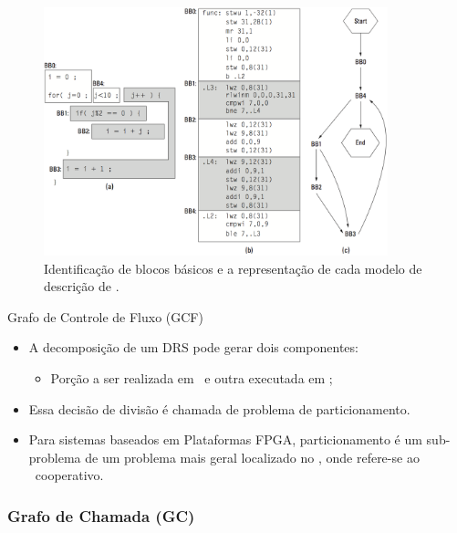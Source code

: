    \begin{frame} %
      \begin{figure}[h] \centering
         \includegraphics[width=0.89\textwidth]{img/f3-6.png}
         \caption{Identificação de blocos básicos e a representação de cada modelo de descrição de \software.}
      \end{figure}
   \end{frame}

   \begin{frame}{Grafo de Controle de Fluxo (GCF)}
      \begin{itemize}
         \setlength{\itemsep}{1.6em}
         \item A decomposição de um DRS pode gerar dois componentes:
         \begin{itemize}
            \item Porção a ser realizada em \hardware\ e outra executada em \software;
         \end{itemize}

         \item Essa decisão de divisão é chamada de problema de particionamento.

         \item Para sistemas baseados em Plataformas FPGA, particionamento é um sub-problema de um problema mais geral localizado no \codesign, onde refere-se ao \design\ cooperativo.
      \end{itemize}
   \end{frame}


   \subsubsection{Grafo de Chamada (GC)}

